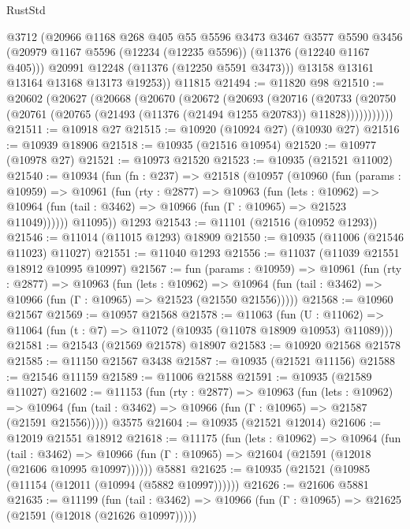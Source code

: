 \begin{lexlean}{RustStd}
\begin{coremodule}
{\begin{coremodule}
{{{{{{{{{{{{{{{{{{{{{{{{{{{{{{{{{{{{{{{{{{{{{{{{{{{{{{{{{{{{{{{{{{{{{{{{{{{{{{{{{{{{{        @3712
        (@20966
          @1168
          @268
          @405
          @55
          @5596
          @3473
          @3467
          @3577
          @5590
          @3456
          (@20979 @1167 @5596 (@12234 (@12235 @5596)) (@11376 (@12240 @1167 @405)))
          @20991
          @12248
          (@11376 (@12250 @5591 @3473)))
        @13158
        @13161
        @13164
        @13168
        @13173
        @19253))
    @11815
@21494 := @11820 @98
@21510 := @20602
    (@20627
      (@20668
        (@20670
          (@20672
            (@20693
              (@20716
                (@20733
                  (@20750 (@20761 (@20765 (@21493 (@11376 (@21494 @1255 @20783)) @11828)))))))))))
@21511 := @10918 @27
@21515 := @10920 (@10924 @27) (@10930 @27)
@21516 := @10939 @18906
@21518 := @10935 (@21516 @10954)
@21520 := @10977 (@10978 @27)
@21521 := @10973 @21520
@21523 := @10935 (@21521 @11002)
@21540 := @10934
    (fun (fn : @237) =>
    @21518
      (@10957
        (@10960
          (fun (params : @10959) =>
          @10961
            (fun (rty : @2877) =>
            @10963
              (fun (lets : @10962) =>
              @10964 (fun (tail : @3462) => @10966 (fun (Γ : @10965) => @21523 @11049))))))
        @11095))
    @1293
@21543 := @11101 (@21516 (@10952 @1293))
@21546 := @11014 (@11015 @1293) @18909
@21550 := @10935 (@11006 (@21546 @11023) @11027)
@21551 := @11040 @1293
@21556 := @11037 (@11039 @21551 @18912 @10995 @10997)
@21567 := fun (params : @10959) =>
  @10961
    (fun (rty : @2877) =>
    @10963
      (fun (lets : @10962) =>
      @10964 (fun (tail : @3462) => @10966 (fun (Γ : @10965) => @21523 (@21550 @21556)))))
@21568 := @10960 @21567
@21569 := @10957 @21568
@21578 := @11063
    (fun (U : @11062) => @11064 (fun (t : @7) => @11072 (@10935 (@11078 @18909 @10953) @11089)))
@21581 := @21543 (@21569 @21578) @18907
@21583 := @10920 @21568 @21578
@21585 := @11150 @21567 @3438
@21587 := @10935 (@21521 @11156)
@21588 := @21546 @11159
@21589 := @11006 @21588
@21591 := @10935 (@21589 @11027)
@21602 := @11153
    (fun (rty : @2877) =>
    @10963
      (fun (lets : @10962) =>
      @10964 (fun (tail : @3462) => @10966 (fun (Γ : @10965) => @21587 (@21591 @21556)))))
    @3575
@21604 := @10935 (@21521 @12014)
@21606 := @12019 @21551 @18912
@21618 := @11175
    (fun (lets : @10962) =>
    @10964
      (fun (tail : @3462) =>
      @10966 (fun (Γ : @10965) => @21604 (@21591 (@12018 (@21606 @10995 @10997))))))
    @5881
@21625 := @10935 (@21521 (@10985 (@11154 (@12011 (@10994 (@5882 @10997))))))
@21626 := @21606 @5881
@21635 := @11199
    (fun (tail : @3462) => @10966 (fun (Γ : @10965) => @21625 (@21591 (@12018 (@21626 @10997)))))
}}}}}}}}}}}}}}}}}}}}}}}}}}}}}}}}}}}}}}}}}}}}}}}}}}}}}}}}}}}}}}}}}}}}}}}}}}}}}}}}}}}}}
\end{coremodule}}
\end{coremodule}
\end{lexlean}
